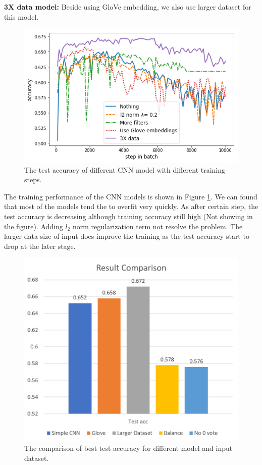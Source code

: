 \documentclass[11pt]{article}
\begin{document}
\textbf{3X data model:} Beside using GloVe embedding, we also use larger dataset for this model.

\begin{figure}[tbp]
    \centering
    \includegraphics[width=0.9\linewidth]{CnnResultTrain.png}
    \caption{The test accuracy of different CNN model with different training steps.}
    \label{fig:cnn_result}
\end{figure}

The training performance of the CNN models is shown in Figure \ref{fig:cnn_result}. We can found that most of the models tend the to overfit very quickly. As after certain step, the test accuracy is decreasing although training accuracy still high (Not showing in the figure). Adding \(l_2\) norm regularization term not resolve the problem. The larger data size of input does improve the training as the test accuracy start to drop at the later stage.

\begin{figure}[tbp]
    \centering
    \includegraphics[width=0.9\linewidth]{CnnResult.png}
    \caption{The comparison of best test accuracy for different model and input dataset.}
    \label{fig:cnn_result_2}
\end{figure}
\end{document}
